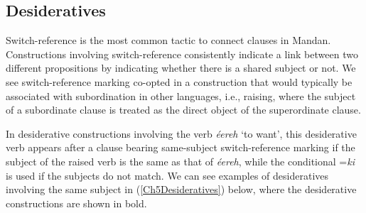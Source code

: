\subsection{Desideratives}\label{Ch5Desideritives}

Switch-reference is the most common tactic to connect clauses in Mandan. Constructions involving switch-reference consistently indicate a link between two different propositions by indicating whether there is a shared subject or not. We see switch-reference marking co-opted in a construction that would typically be associated with subordination in other languages, i.e., raising, where the subject of a subordinate clause is treated as the direct object of the superordinate clause. 

In desiderative constructions involving the verb \textit{éereh} `to want', this desiderative verb appears after a clause bearing same-subject switch-reference marking if the subject of the raised verb is the same as that of \textit{éereh}, while the conditional =\textit{ki} is used if the subjects do not match. We can see examples of desideratives involving the same subject in (\ref{Ch5Desideratives}) below, where the desiderative constructions are shown in bold.

